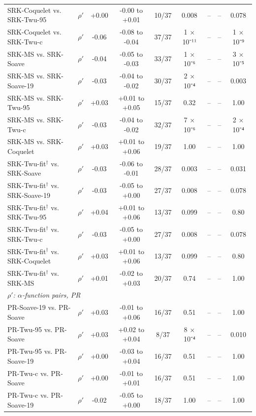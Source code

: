 \begin{table}[H]
\begin{tabular}{llccccccc}
SRK-Coquelet vs. SRK-Twu-95 & $\rho'$ & +0.00 & -0.00 to +0.01 & 10/37 & 0.008 & -- & -- & 0.078 \\
SRK-Coquelet vs. SRK-Twu-c & $\rho'$ & -0.06 & -0.08 to -0.04 & 37/37 & 1 × 10⁻¹¹ & -- & -- & 1 × 10⁻⁹ \\
SRK-MS vs. SRK-Soave & $\rho'$ & -0.04 & -0.05 to -0.03 & 33/37 & 1 × 10⁻⁶ & -- & -- & 3 × 10⁻⁵ \\
SRK-MS vs. SRK-Soave-19 & $\rho'$ & -0.03 & -0.04 to -0.02 & 30/37 & 2 × 10⁻⁴ & -- & -- & 0.003 \\
SRK-MS vs. SRK-Twu-95 & $\rho'$ & +0.03 & +0.01 to +0.05 & 15/37 & 0.32 & -- & -- & 1.00 \\
SRK-MS vs. SRK-Twu-c & $\rho'$ & -0.03 & -0.04 to -0.02 & 32/37 & 7 × 10⁻⁶ & -- & -- & 2 × 10⁻⁴ \\
SRK-MS vs. SRK-Coquelet & $\rho'$ & +0.03 & +0.01 to +0.06 & 19/37 & 1.00 & -- & -- & 1.00 \\
SRK-Twu-fit$^{\dagger}$ vs. SRK-Soave & $\rho'$ & -0.03 & -0.06 to -0.01 & 28/37 & 0.003 & -- & -- & 0.031 \\
SRK-Twu-fit$^{\dagger}$ vs. SRK-Soave-19 & $\rho'$ & -0.03 & -0.05 to +0.00 & 27/37 & 0.008 & -- & -- & 0.078 \\
SRK-Twu-fit$^{\dagger}$ vs. SRK-Twu-95 & $\rho'$ & +0.04 & +0.01 to +0.06 & 13/37 & 0.099 & -- & -- & 0.80 \\
SRK-Twu-fit$^{\dagger}$ vs. SRK-Twu-c & $\rho'$ & -0.03 & -0.05 to +0.00 & 27/37 & 0.008 & -- & -- & 0.078 \\
SRK-Twu-fit$^{\dagger}$ vs. SRK-Coquelet & $\rho'$ & +0.03 & +0.01 to +0.06 & 13/37 & 0.099 & -- & -- & 0.80 \\
SRK-Twu-fit$^{\dagger}$ vs. SRK-MS & $\rho'$ & +0.01 & -0.02 to +0.03 & 20/37 & 0.74 & -- & -- & 1.00 \\
\multicolumn{9}{l}{\emph{$\rho'$: $\alpha$-function pairs, PR}} \\
PR-Soave-19 vs. PR-Soave & $\rho'$ & +0.03 & -0.01 to +0.06 & 16/37 & 0.51 & -- & -- & 1.00 \\
PR-Twu-95 vs. PR-Soave & $\rho'$ & +0.03 & +0.02 to +0.04 & 8/37 & 8 × 10⁻⁴ & -- & -- & 0.010 \\
PR-Twu-95 vs. PR-Soave-19 & $\rho'$ & +0.00 & -0.03 to +0.04 & 16/37 & 0.51 & -- & -- & 1.00 \\
PR-Twu-c vs. PR-Soave & $\rho'$ & +0.00 & -0.01 to +0.01 & 16/37 & 0.51 & -- & -- & 1.00 \\
PR-Twu-c vs. PR-Soave-19 & $\rho'$ & -0.02 & -0.05 to +0.00 & 18/37 & 1.00 & -- & -- & 1.00 \\

\end{tabular}
\end{table}
